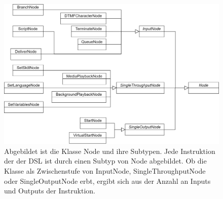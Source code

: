 \begin{figure} %
	\centering
		\includegraphics[width=\textwidth]{img/NodeHierarchy.png}
	\caption[Klassenhierarchie der Klasse Node]{Abgebildet ist die Klasse Node und ihre Subtypen. Jede Instruktion der der DSL ist durch einen Subtyp von Node abgebildet. Ob die Klasse als Zwischenstufe von InputNode, SingleThroughputNode oder SingleOutputNode erbt, ergibt sich aus der Anzahl an Inputs und Outputs der Instruktion.}
	\label{fig:UML:Node-Hierarchy}
\end{figure}

